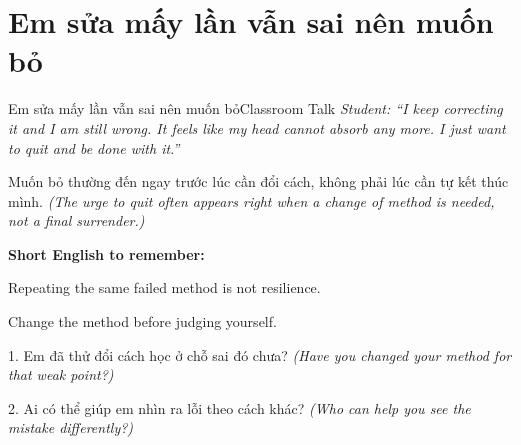 \section{Em sửa mấy lần vẫn sai nên muốn bỏ}
\begin{truyen}{Em sửa mấy lần vẫn sai nên muốn bỏ}{Classroom Talk}
\textit{Student: ``I keep correcting it and I am still wrong. It feels like my head cannot absorb any more. I just want to quit and be done with it.''}\\[4pt]



\end{truyen}

\begin{baihoc}
Muốn bỏ thường đến ngay trước lúc cần đổi cách, không phải lúc cần tự kết thúc mình.
\textit{(The urge to quit often appears right when a change of method is needed, not a final surrender.)}
\end{baihoc}

\begin{ghinhoanh}
\textbf{Short English to remember:}

Repeating the same failed method is not resilience.

Change the method before judging yourself.
\end{ghinhoanh}

\begin{tuhocnhanh}
1. Em đã thử đổi cách học ở chỗ sai đó chưa? \textit{(Have you changed your method for that weak point?)}

2. Ai có thể giúp em nhìn ra lỗi theo cách khác? \textit{(Who can help you see the mistake differently?)}
\end{tuhocnhanh}
\ngancach

